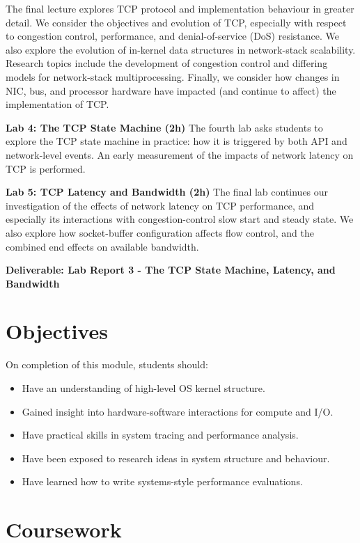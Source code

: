 \documentclass[a4paper,10pt]{article}
\begin{document}
\begin{description}
  The final lecture explores TCP protocol and implementation behaviour in
  greater detail.
  We consider the objectives and evolution of TCP, especially with respect to
  congestion control, performance, and denial-of-service (DoS) resistance.
  We also explore the evolution of in-kernel data structures in network-stack
  scalability.
  Research topics include the development of congestion control and differing
  models for network-stack multiprocessing.
  Finally, we consider how changes in NIC, bus, and processor hardware have
  impacted (and continue to affect) the implementation of TCP.

  \noindent
  \textbf{Lab 4: The TCP State Machine (2h)}
  The fourth lab asks students to explore the TCP state machine in practice:
  how it is triggered by both API and network-level events.
  An early measurement of the impacts of network latency on TCP is performed.

  \noindent
  \textbf{Lab 5: TCP Latency and Bandwidth (2h)}
  The final lab continues our investigation of the effects of network latency
  on TCP performance, and especially its interactions with congestion-control
  slow start and steady state.
  We also explore how socket-buffer configuration affects flow control, and
  the combined end effects on available bandwidth.

  \noindent
  \textbf{Deliverable: Lab Report 3 - The TCP State Machine, Latency, and
    Bandwidth}
\end{description}

\section{Objectives}

On completion of this module, students should:

\begin{itemize}
\item Have an understanding of high-level OS kernel structure.
\item Gained insight into hardware-software interactions for compute and I/O.
\item Have practical skills in system tracing and performance analysis.
\item Have been exposed to research ideas in system structure and behaviour.
\item Have learned how to write systems-style performance evaluations.
\end{itemize}

\section{Coursework}
\end{document}
